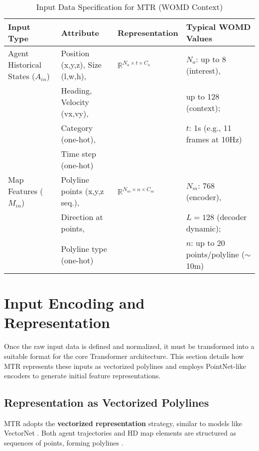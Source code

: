 \begin{table}[h!]
    \centering
    \caption{Input Data Specification for MTR (WOMD Context)}
    \label{tab:input_spec}
    \begin{tabular}{@{}llll@{}}
        \toprule
        Input Type & Attribute & Representation & Typical WOMD Values \\
        \midrule
        Agent Historical States ($A_{in}$) & Position (x,y,z), Size (l,w,h), & $\mathbb{R}^{N_a \times t \times C_a}$ & $N_a$: up to 8 (interest), \\
        & Heading, Velocity (vx,vy), & & up to 128 (context); \\
        & Category (one-hot), & & $t$: 1s (e.g., 11 frames at 10Hz) \\
        & Time step (one-hot) & & \\
        \addlinespace
        Map Features ($M_{in}$) & Polyline points (x,y,z seq.), & $\mathbb{R}^{N_m \times n \times C_m}$ & $N_m$: 768 (encoder), \\
        & Direction at points, & & $L=128$ (decoder dynamic); \\
        & Polyline type (one-hot) & & $n$: up to 20 points/polyline ($\sim$10m) \\
        \bottomrule
    \end{tabular}
\end{table}

\section{Input Encoding and Representation}
\label{sec:input_encoding}

Once the raw input data is defined and normalized, it must be transformed into a suitable format for the core Transformer architecture. This section details how MTR represents these inputs as vectorized polylines and employs PointNet-like encoders to generate initial feature representations.

\subsection{Representation as Vectorized Polylines}
\label{subsec:vectorized_polylines}

MTR adopts the \textbf{vectorized representation} strategy, similar to models like VectorNet \cite{VectorNet2020}. Both agent trajectories and HD map elements are structured as sequences of points, forming polylines \cite{Shi2022MTR, Shi2022MTR_A}.

